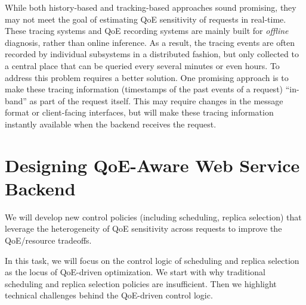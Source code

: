 While both history-based and tracking-based approaches sound promising, they may not meet the goal of estimating QoE sensitivity of requests in real-time. 
These tracing systems and QoE recording systems are mainly built for {\em offline} diagnosis, rather than online inference. As a result, the tracing events are often recorded by individual subsystems in a distributed fashion, but only collected to a central place that can be queried every several minutes or even hours. 
To address this problem requires a better solution. 
One promising approach is to make these tracing information (\eg timestamps of the past events of a request) ``in-band'' as part of the request itself. This may require changes in the message format or client-facing interfaces, but will make these tracing information instantly available when the backend receives the request.


\section{Designing QoE-Aware Web Service Backend}
\label{sec:design}

\begin{task}
We will develop new control policies (including scheduling, replica selection) that leverage the heterogeneity of QoE sensitivity across requests to improve the QoE/resource tradeoffs.
\end{task}

In this task, we will focus on the control logic of scheduling and replica selection as the locus of QoE-driven optimization. 
We start with why traditional scheduling and replica selection policies are insufficient.
Then we highlight technical challenges behind the QoE-driven control logic.



